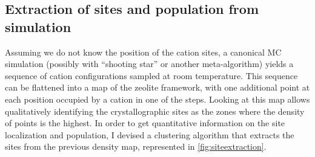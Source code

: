 \documentclass[main.tex]{subfiles}
\begin{document}
\subsection{Extraction of sites and population from simulation}

\label{siteextraction}



Assuming we do not know the position of the cation sites, a canonical MC simulation (possibly with ``shooting star'' or another meta-algorithm) yields a sequence of cation configurations sampled at room temperature. This sequence can be flattened into a map of the zeolite framework, with one additional point at each position occupied by a cation in one of the steps. Looking at this map allows qualitatively identifying the crystallographic sites as the zones where the density of points is the highest. In order to get quantitative information on the site localization and population, I devised a clustering algorithm that extracts the sites from the previous density map, represented in \cref{fig:siteextraction}.
\end{document}
